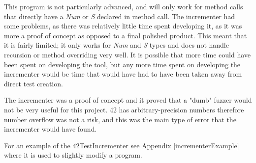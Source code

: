 This program is not particularly advanced, and will only work for method calls that directly have a \textit{Num} or \textit{S} declared in method call. The incrementer had some problems, as there was relatively little time spent developing it, as it was more a proof of concept as opposed to a final polished product. This meant that it is fairly limited; it only works for \textit{Num} and \textit{S} types and does not handle recursion or method overriding very well. It is possible that more time could have been spent on developing the tool, but any more time spent on developing the incrementer would be time that would have had to have been taken away from direct test creation.

The incrementer was a proof of concept and it proved that a "dumb" fuzzer would not be very useful for this project. 42 has arbitrary-precision numbers therefore number overflow was not a risk, and this was the main type of error that the incrementer would have found.

For an example of the 42TestIncrementer see Appendix \ref{incrementerExample} where it is used to slightly modify a program.



